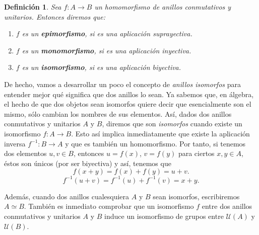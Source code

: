 \documentclass[12pt]{article}
\newtheorem{definition}[theorem]{Definición}
\begin{document}
\begin{definition} Sea $f \colon A \longrightarrow B$ un homomorfismo de anillos conmutativos y unitarios. Entonces diremos que: \begin{enumerate}
\item $f$ es un \textbf{epimorfismo}, si es una aplicación suprayectiva.
\item $f$ es un \textbf{monomorfismo}, si es una aplicación inyectiva.
\item $f$ es un \textbf{isomorfismo}, si es una aplicación biyectiva.
\end{enumerate}
\end{definition}

De hecho, vamos a desarrollar un poco el concepto de \textit{anillos isomorfos} para entender mejor qué significa que dos anillos lo sean. Ya sabemos que, en álgebra, el hecho de que dos objetos sean isomorfos quiere decir que esencialmente son el mismo, sólo cambian los nombres de sus elementos. Así, dados dos anillos conmutativos y unitarios $A$ y $B$, diremos que son \textit{isomorfos} cuando existe un isomorfismo $f \colon A \longrightarrow B$. Esto así implica inmediatamente que existe la aplicación inversa $f^{-1} \colon B \longrightarrow A$ y que es también un homomorfismo. Por tanto, si tenemos dos elementos $u,v \in B$, entonces $u=f(x)$, $v=f(y)$ para ciertos $x,y \in A$, éstos son únicos (por ser biyectiva) y así, tenemos que $$f(x+y)= f(x) + f(y) = u + v.$$ $$f^{-1}(u+v) = f^{-1}(u) + f^{-1}(v)= x + y.$$

Además, cuando dos anillos cualesquiera $A$ y $B$ sean isomorfos, escribiremos $A\simeq B$. También es inmediato comprobar que un isomorfismo $f$ entre dos anillos conmutativos y unitarios $A$ y $B$ induce un isomorfismo de grupos entre $\mathcal{U}(A)$ y $\mathcal{U}(B)$.
\end{document}
